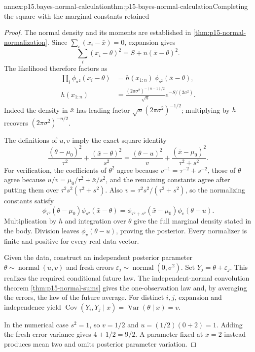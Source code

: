 \begin{annexitem}{annex:p15.bayes-normal-calculation}{thm:p15-bayes-normal-calculation}{Completing the square with the marginal constants retained}
\begin{proof}
The normal density and its moments are established in
\cref{thm:p15-normal-normalization}.
Since \(\sum_i(x_i-\bar x)=0\), expansion gives
\[
 \sum_i(x_i-\theta)^2=S+n(\bar x-\theta)^2.
\]
The likelihood therefore factors as
\[
 \begin{split}
 \prod_i\phi_{\sigma^2}(x_i-\theta)
 &=h(x_{1:n})\,\phi_{s^2}(\bar x-\theta),\\
 h(x_{1:n})
 &=\frac{(2\pi\sigma^2)^{-(n-1)/2}}{\sqrt n}
                            e^{-S/(2\sigma^2)}.
 \end{split}
\]
Indeed the density in \(\bar x\) has leading factor
\(\sqrt n(2\pi\sigma^2)^{-1/2}\); multiplying by \(h\)
recovers \((2\pi\sigma^2)^{-n/2}\).

The definitions of \(u,v\) imply the exact square identity
\[
 \frac{(\theta-\mu_0)^2}{\tau^2}
  +\frac{(\bar x-\theta)^2}{s^2}
  =\frac{(\theta-u)^2}{v}
       +\frac{(\bar x-\mu_0)^2}{\tau^2+s^2}.
\]
For verification, the coefficients of \(\theta^2\) agree
because \(v^{-1}=\tau^{-2}+s^{-2}\), those of \(\theta\)
agree because \(u/v=\mu_0/\tau^2+\bar x/s^2\), and the
remaining constants agree after putting them over
\(\tau^2s^2(\tau^2+s^2)\).
Also \(v=\tau^2s^2/(\tau^2+s^2)\), so the normalizing
constants satisfy
\[
 \phi_{\tau^2}(\theta-\mu_0)\phi_{s^2}(\bar x-\theta)
  =\phi_{\tau^2+s^2}(\bar x-\mu_0)\phi_v(\theta-u).
\]
Multiplication by \(h\) and integration over \(\theta\)
give the full marginal density stated in the body.
Division leaves \(\phi_v(\theta-u)\), proving the posterior.
Every normalizer is finite and positive for every real data vector.

Given the data, construct an independent posterior parameter
\(\theta\sim\operatorname{normal}(u,v)\) and fresh errors
\(\varepsilon_j\sim\operatorname{normal}(0,\sigma^2)\).
Set \(Y_j=\theta+\varepsilon_j\). This realizes the required
conditional future law. The independent-normal convolution
theorem \cref{thm:p15-normal-sums} gives the one-observation
law and, by averaging the errors, the law of the future average.
For distinct \(i,j\), expansion and independence yield
\(\operatorname{Cov}(Y_i,Y_j\mid x)=\operatorname{Var}(\theta\mid x)=v\).

In the numerical case \(s^2=1\), so \(v=1/2\) and
\(u=(1/2)(0+2)=1\). Adding the fresh error variance gives
\(4+1/2=9/2\). A parameter fixed at \(\bar x=2\) instead
produces mean two and omits posterior parameter variation.
\end{proof}
\end{annexitem}

